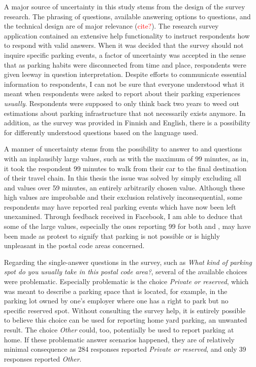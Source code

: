A major source of uncertainty in this study stems from the design of the survey research. The phrasing of questions, available answering options to questions, and the technical design are of major relevance (\textcolor{red}{cite?}). The research survey application contained an extensive help functionality to instruct respondents how to respond with valid answers. When it was decided that the survey should not inquire specific parking events, a factor of uncertainty was accepted in the sense that as parking habits were disconnected from time and place, respondents were given leeway in question interpretation. Despite efforts to communicate essential information to respondents, I can not be sure that everyone understood what it meant when respondents were asked to report about their parking experiences \textit{usually}. Respondents were supposed to only think back two years to weed out estimations about parking infrastructure that not necessarily exists anymore. In addition, as the survey was provided in Finnish and English, there is a possibility for differently understood questions based on the language used.

A manner of uncertainty stems from the possibility to answer to  and  questions with an inplausibly large values, such as with the maximum of 99 minutes, as in, it took the respondent 99 minutes to walk from their car to the final destination of their travel chain. In this thesis the issue was solved by simply excluding all  and  values over 59 minutes, an entirely arbitrarily chosen value. Although these high values are improbable and their exclusion relatively inconsequential, some respondents may have reported real parking events which have now been left unexamined. Through feedback received in Facebook, I am able to deduce that some of the large values, especially the ones reporting 99 for both  and , may have been made as protest to signify that parking is not possible or is highly unpleasant in the postal code areas concerned.

Regarding the single-answer questions in the survey, such as \textit{What kind of parking spot do you usually take in this postal code area?}, several of the available choices were problematic. Especially problematic is the choice \textit{Private or reserved}, which was meant to describe a parking space that is located, for example, in the parking lot owned by one's employer where one has a right to park but no specific reserved spot. Without consulting the survey help, it is entirely possible to believe this choice can be used for reporting home yard parking, an unwanted result. The choice \textit{Other} could, too, potentially be used to report parking at home. If these problematic  answer scenarios happened, they are of relatively minimal consequence as 284 responses reported \textit{Private or reserved}, and only 39 responses reported \textit{Other}.

